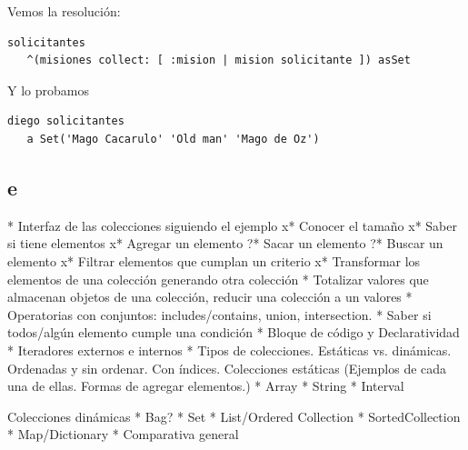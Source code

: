 \documentclass[a4paper,12pt]{book}
\begin{document}
Vemos la resolución:

\begin{lstlisting}[frame=single]
solicitantes
   ^(misiones collect: [ :mision | mision solicitante ]) asSet
\end{lstlisting}

Y lo probamos 
\begin{lstlisting}[frame=single]
diego solicitantes
   a Set('Mago Cacarulo' 'Old man' 'Mago de Oz')
\end{lstlisting}

\subsection{e}
* Interfaz de las colecciones siguiendo el ejemplo
  x* Conocer el tamaño
  x* Saber si tiene elementos
  x* Agregar un elemento
  ?* Sacar un elemento
  ?* Buscar un elemento
  x* Filtrar elementos que cumplan un criterio
  x* Transformar los elementos de una colección generando otra colección
  * Totalizar valores que almacenan objetos de una colección, reducir una colección a un valores
  * Operatorias con conjuntos: includes/contains, union, intersection.
  * Saber si todos/algún elemento cumple una condición
  * Bloque de código y Declaratividad
* Iteradores externos e internos
* Tipos de colecciones. Estáticas vs. dinámicas. Ordenadas y sin ordenar. Con índices.
  Colecciones estáticas (Ejemplos de cada una de ellas. Formas de agregar elementos.)
  * Array
  * String
  * Interval
  
  Colecciones dinámicas
  * Bag?
  * Set
  * List/Ordered Collection
  * SortedCollection
  * Map/Dictionary
  * Comparativa general

  
  
\end{document}
